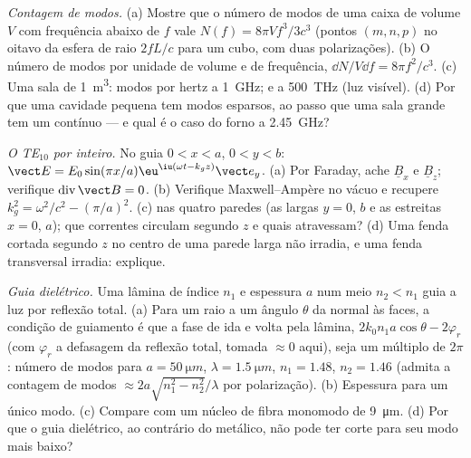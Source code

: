 \begin{exercise}[$\star\star$]\label{exo:b2:guided-waves:9}
\emph{Contagem de modos.} (a) Mostre que o número de modos de uma caixa de
volume $V$ com frequência abaixo de $f$ vale $N(f) = 8\pi Vf^3/3c^3$ (pontos
$(m, n, p)$ no oitavo da esfera de raio $2fL/c$ para um cubo, com duas
polarizações). (b) O número de modos por unidade de volume e de frequência,
$\dd N/V\dd f = 8\pi f^2/c^3$. (c) Uma sala de \qty{1}{m^3}: modos por hertz a
\qty{1}{GHz}; e a \qty{500}{THz} (luz visível). (d) Por que uma cavidade pequena
tem modos esparsos, ao passo que uma sala grande tem um contínuo --- e qual
é o caso do forno a \qty{2.45}{GHz}?
\end{exercise}

\begin{exercise}[$\star\star\star$]\label{exo:b2:guided-waves:10}
\emph{O TE$_{10}$ por inteiro.} No guia $0 < x < a$, $0 < y < b$: $\vect E =
E_0\sin(\pi x/a)\eu^{\iu(\omega t - k_gz)}\vect e_y$. (a) Por Faraday, ache $\underline B_x$
e $\underline B_z$; verifique $\operatorname{div}\vect B = 0$. (b) Verifique Maxwell--Ampère
no vácuo e recupere $k_g^2 = \omega^2/c^2 - (\pi/a)^2$. (c) 
nas quatro paredes (as largas $y = 0$, $b$ e as estreitas $x = 0$,
$a$); que correntes circulam segundo $z$ e quais atravessam? (d) Uma fenda cortada segundo
$z$ no centro de uma parede larga não irradia, e uma fenda transversal
irradia: explique.
\end{exercise}

\begin{exercise}[$\star\star\star$]\label{exo:b2:guided-waves:11}
\emph{Guia dielétrico.} Uma lâmina de índice $n_1$ e espessura $a$ num
meio $n_2 < n_1$ guia a luz por reflexão total. (a) Para um raio a um
ângulo $\theta$ da normal às faces, a condição de guiamento é que
a fase de ida e volta pela lâmina, $2k_0n_1a\cos\theta - 2\varphi_r$ (com $\varphi_r$
a defasagem da reflexão total, tomada $\approx 0$ aqui), seja um múltiplo
de $2\pi$: número de modos para $a = \qty{50}{\micro m}$, $\lambda = \qty{1.5}{\micro m}$,
$n_1 = 1.48$, $n_2 = 1.46$ (admita a contagem de modos $\approx 2a\sqrt{n_1^2 - n_2^2}/\lambda$
por polarização). (b) Espessura para um único modo. (c) Compare com um
núcleo de fibra monomodo de \qty{9}{\micro m}. (d) Por que o guia dielétrico,
ao contrário do metálico, não pode ter corte para seu modo mais baixo?
\end{exercise}

